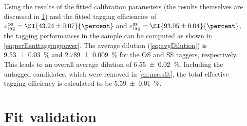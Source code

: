 Using the results of the fitted calibration parameters (the results themselves are discussed in \cref{sec:decTimeFitVal}) and the fitted tagging efficiencies of $\varepsilon_{\text{tag}}^{\text{\tiny OS}}=\SI{43.24\pm0.07}{\percent}$ and $\varepsilon_{\text{tag}}^{\text{\tiny SS}}=\SI{93.05\pm0.04}{\percent}$, the tagging performances in the sample can be computed as shown in \cref{eq:perEenttaggingpower}.
The average dilution (\cref{eq:avgDilution}) is \SI{9.53\pm0.03}{\percent} and \SI{2.789\pm0.009}{\percent} for the OS and SS taggers, respectively.
This leads to an overall average dilution of \SI{6.55\pm0.02}{\percent}.
Including the untagged candidates, which were removed in \cref{ch:massfit}, the total effective tagging efficiency is calculated to be \SI{5.59\pm0.01}{\percent}.

\section{Fit validation}
\label{sec:decTimeFitVal}

